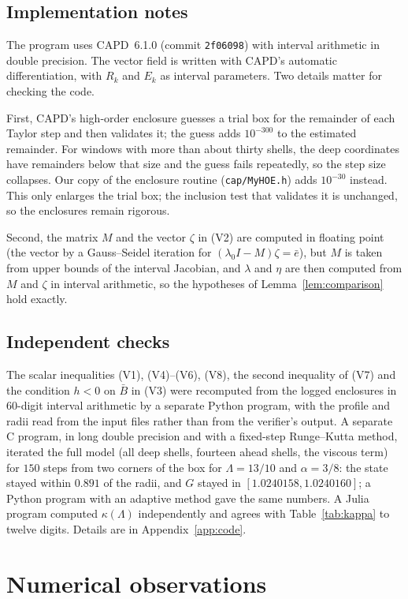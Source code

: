 \documentclass[12pt,reqno]{amsart}
\numberwithin{equation}{section}
\theoremstyle{plain}
\theoremstyle{definition}
\theoremstyle{remark}
\begin{document}
\subsection{Implementation notes}
The program uses CAPD~6.1.0 (commit \texttt{2f06098}) with interval
arithmetic in double precision. The vector field is written with
CAPD's automatic differentiation, with $R_k$ and $E_k$ as interval
parameters. Two details matter for checking the code.

First, CAPD's high-order enclosure guesses a trial box for the
remainder of each Taylor step and then validates it; the guess adds
$10^{-300}$ to the estimated remainder. For windows with more than about
thirty shells, the deep coordinates have remainders below that size
and the guess fails repeatedly, so the step size collapses. Our copy of
the enclosure routine (\texttt{cap/MyHOE.h}) adds $10^{-30}$ instead. This only
enlarges the trial box; the inclusion test that validates it is
unchanged, so the enclosures remain rigorous.

Second, the matrix $M$ and the vector $\zeta$ in (V2) are computed in floating
point (the vector by a Gauss--Seidel iteration for $(\lambda_0I-M)\zeta=\bar e$), but
$M$ is taken from upper bounds of the interval Jacobian, and $\lambda$ and $\eta$
are then computed from $M$ and $\zeta$ in interval arithmetic, so the
hypotheses of Lemma~\ref{lem:comparison} hold exactly.

\subsection{Independent checks}
The scalar inequalities (V1), (V4)--(V6), (V8), the second inequality
of (V7) and the condition $h<0$ on $\bar B$ in (V3) were recomputed from the logged
enclosures in $60$-digit interval arithmetic by a separate Python
program, with the profile and radii read from the input files rather
than from the verifier's output. A separate C program, in long double
precision and with a fixed-step Runge--Kutta method, iterated the full
model (all deep shells, fourteen ahead shells, the viscous term) for
$150$ steps from two corners of the box for $\Lambda=13/10$ and $\alpha=3/8$:
the state stayed within $0.891$ of the radii, and $G$ stayed in
$[1.0240158,1.0240160]$; a Python program with an adaptive method gave the
same numbers. A Julia program computed $\kappa(\Lambda)$ independently and agrees
with Table~\ref{tab:kappa} to twelve digits. Details are in
Appendix~\ref{app:code}.

\section{Numerical observations}\label{sec:numerics}
\end{document}
